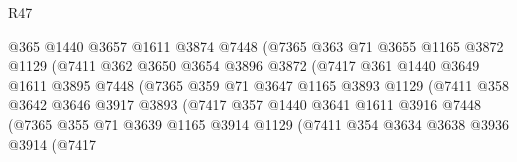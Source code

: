 \begin{lexlean}{R47}
\begin{coremodule}
                              @365
                              @1440
                              @3657
                              @1611
                              @3874
                              @7448
                              (@7365
                                @363
                                @71
                                @3655
                                @1165
                                @3872
                                @1129
                                (@7411
                                  @362
                                  @3650
                                  @3654
                                  @3896
                                  @3872
                                  (@7417
                                    @361
                                    @1440
                                    @3649
                                    @1611
                                    @3895
                                    @7448
                                    (@7365
                                      @359
                                      @71
                                      @3647
                                      @1165
                                      @3893
                                      @1129
                                      (@7411
                                        @358
                                        @3642
                                        @3646
                                        @3917
                                        @3893
                                        (@7417
                                          @357
                                          @1440
                                          @3641
                                          @1611
                                          @3916
                                          @7448
                                          (@7365
                                            @355
                                            @71
                                            @3639
                                            @1165
                                            @3914
                                            @1129
                                            (@7411
                                              @354
                                              @3634
                                              @3638
                                              @3936
                                              @3914
                                              (@7417

\end{coremodule}
\end{lexlean}
